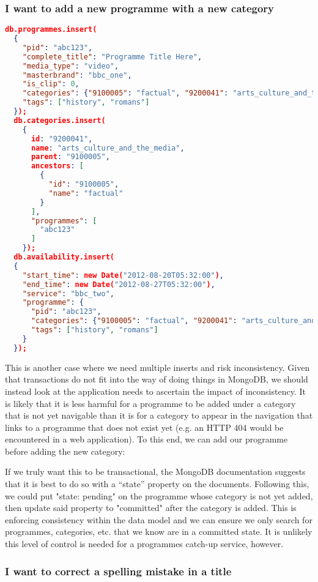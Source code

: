 \documentclass[11pt,a4paper]{article}
\begin{document}
\subsubsection{I want to add a new programme with a new category}

\begin{lstlisting}[language=json]
  db.programmes.insert(
  {
    "pid": "abc123",
    "complete_title": "Programme Title Here",
    "media_type": "video",
    "masterbrand": "bbc_one",
    "is_clip": 0,
    "categories": {"9100005": "factual", "9200041": "arts_culture_and_the_media"},
    "tags": ["history", "romans"]
  });
  db.categories.insert(
    {
      id: "9200041",
      name: "arts_culture_and_the_media",
      parent: "9100005",
      ancestors: [
        {
          "id": "9100005",
          "name": "factual"
        }
      ],
      "programmes": [
        "abc123"
      ]
    });
  db.availability.insert(
  {
    "start_time": new Date("2012-08-20T05:32:00"),
    "end_time": new Date("2012-08-27T05:32:00"),
    "service": "bbc_two",
    "programme": {
      "pid": "abc123",
      "categories": {"9100005": "factual", "9200041": "arts_culture_and_the_media"},
      "tags": ["history", "romans"]
    }
  });
\end{lstlisting}

This is another case where we need multiple inserts and risk inconsistency.
Given that transactions do not fit into the way of doing things in MongoDB,
we should instead look at the application needs to ascertain the impact
of inconsistency. It is likely that it is less harmful for a programme to be
added under a category that is not yet navigable than it is for a category
to appear in the navigation that links to a programme that does not exist yet
(e.g. an HTTP 404 would be encountered in a web application). To this
end, we can add our programme before adding the new category:

If we truly want this to be transactional, the MongoDB
documentation suggests \cite{mongo-two-phase-commits} that it
is best to do so with a ``state'' property on the documents.
Following this, we could put "state: pending" on the programme
whose category is not yet added, then update said property
to "committed" after the category is added. This is enforcing
consistency within the data model and we can ensure we only
search for programmes, categories, etc. that we know are in
a committed state. It is unlikely this level of control is needed
for a programmes catch-up service, however.

\subsubsection{I want to correct a spelling mistake in a title}
\end{document}
